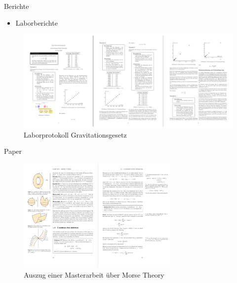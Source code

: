 \documentclass{beamer}
\begin{document}
\begin{frame}{Berichte}
    \begin{itemize}
        \item Laborberichte 
    \end{itemize}
    \begin{figure}[htpb]
        \centering
        \includegraphics[width=1\textwidth]{./figs/am stueck.png}
        \caption{Laborprotokoll Gravitationsgesetz}
        \label{fig:}
    \end{figure}
\end{frame}



\begin{frame}{Paper}
    \begin{figure}[htpb]
        \centering
        \includegraphics[width=0.7\textwidth]{./figs/example-paper.png}
        \caption{Auszug einer Masterarbeit \"uber Morse Theory}
    \end{figure}
\end{frame}
\end{document}
